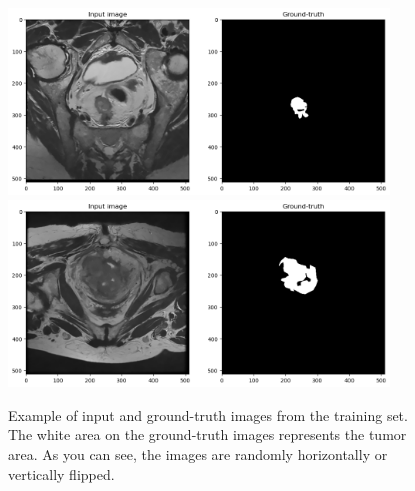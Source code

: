 \documentclass{standalone}
\begin{document}
\begin{figure}[htp]

    \centering
    \includegraphics[width=0.9\textwidth]{../images/showdataset.png}
    \includegraphics[width=0.9\textwidth]{../images/showdataset1.png}

    \caption{Example of input and ground-truth images from the training set.
    The white area on the ground-truth images represents the tumor area. As you can see, the images are randomly horizontally or vertically flipped. }
    \label{showdataset}
    
    \end{figure}
\end{document}

